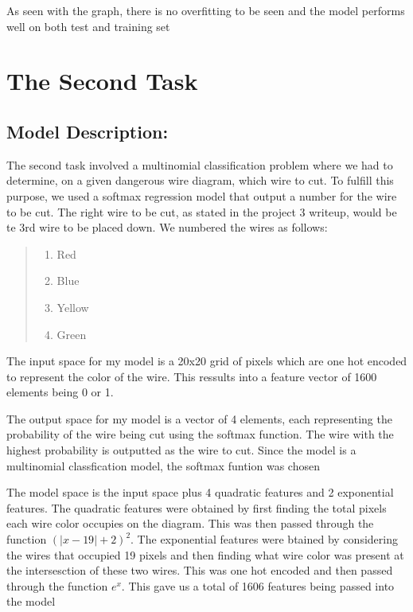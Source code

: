 \documentclass{article}
\begin{document}
\noindent As seen with the graph, there is no overfitting to be seen and the model performs well on both test and training set






\section*{The Second Task}
\subsection*{Model Description:}
The second task involved a multinomial classification problem where we had to determine, on a given dangerous wire diagram, which wire to cut.
To fulfill this purpose, we used a softmax regression model that output a number for the wire to be cut. The right wire to be cut, as stated in the project 3 writeup, would be te 3rd wire to be placed down.\newline
\newline
We numbered the wires as follows:
\begin{quote}
    \begin{enumerate}
    \item Red
    \item Blue
    \item Yellow
    \item Green
    \end{enumerate}
\end{quote}

\noindent The input space for my model is a 20x20 grid of pixels which are one hot encoded to represent the color of the wire.
This ressults into a feature vector of 1600 elements being 0 or 1. \newline

\noindent The output space for my model is a vector of 4 elements, each representing the probability of the wire being cut using the softmax function.
The wire with the highest probability is outputted as the wire to cut. Since the model is a multinomial classfication model, the softmax funtion was chosen\newline

\noindent The model space is the input space plus 4 quadratic features and 2 exponential features.
The quadratic features were obtained by first finding the total pixels each wire color occupies on the diagram. This was then passed through the function $(| x - 19 | + 2)^2$.
The exponential features were btained by considering the wires that occupied 19 pixels and then finding what wire color was present at the intersesction of these two wires. 
This was one hot encoded and then passed through the function $e^{x}$. This gave us a total of 1606 features being passed into the model\newline
\end{document}
